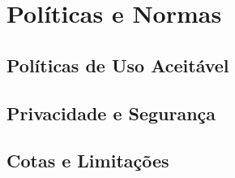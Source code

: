 \chapter{Políticas e Normas}
\label{chap:politicas-e-normas}

\section{Políticas de Uso Aceitável}
\label{sec:politicas-de-uso-aceitavel}

\lipsum[1-2]

\section{Privacidade e Segurança}
\label{sec:privacidade-e-seguranca}

\lipsum[1-2]

\section{Cotas e Limitações}
\label{sec:cotas-e-limitacoes}

\lipsum[1-2]
